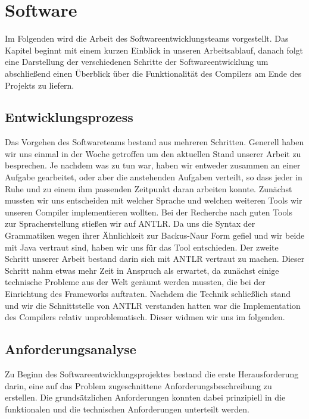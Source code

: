 \documentclass[paper=a4,fontsize=11pt,twocolumn]{scrreprt}
\begin{document}
\chapter{Software}
\label{ch:software}

Im Folgenden wird die Arbeit des Softwareentwicklungsteams vorgestellt. 
Das Kapitel beginnt mit einem kurzen Einblick in unseren Arbeitsablauf, danach folgt eine Darstellung der verschiedenen Schritte der Softwareentwicklung um abschließend einen Überblick über die Funktionalität des Compilers am Ende des Projekts zu liefern.

\section{Entwicklungsprozess}
\label{sec:entwicklungsprozess}

Das Vorgehen des Softwareteams bestand aus mehreren Schritten.
Generell haben wir uns einmal in der Woche getroffen um den aktuellen Stand unserer Arbeit zu besprechen.
Je nachdem was zu tun war, haben wir entweder zusammen an einer Aufgabe gearbeitet, oder aber die anstehenden Aufgaben verteilt, so dass jeder in Ruhe und zu einem ihm passenden Zeitpunkt daran arbeiten konnte.
Zunächst mussten wir uns entscheiden mit welcher Sprache und welchen weiteren Tools wir unseren Compiler implementieren wollten.
Bei der Recherche nach guten Tools zur Spracherstellung stießen wir auf ANTLR.
Da uns die Syntax der Grammatiken wegen ihrer Ähnlichkeit zur Backus-Naur Form gefiel und wir beide mit Java vertraut sind, haben wir uns für das Tool entschieden.
Der zweite Schritt unserer Arbeit bestand darin sich mit ANTLR vertraut zu machen.
Dieser Schritt nahm etwas mehr Zeit in Anspruch als erwartet, da zunächst einige technische Probleme aus der Welt geräumt werden mussten, die bei der Einrichtung des Frameworks auftraten.
Nachdem die Technik schließlich stand und wir die Schnittstelle von ANTLR verstanden hatten war die Implementation des Compilers relativ unproblematisch. Dieser widmen wir uns im folgenden.

\section{Anforderungsanalyse}
\label{sec:anforderungsanalyse}

Zu Beginn des Softwareentwicklungsprojektes bestand die erste Herausforderung darin, eine auf das Problem zugeschnittene Anforderungsbeschreibung zu erstellen.
Die grundsätzlichen Anforderungen konnten dabei prinzipiell in die funktionalen und die technischen Anforderungen unterteilt werden.
\end{document}

